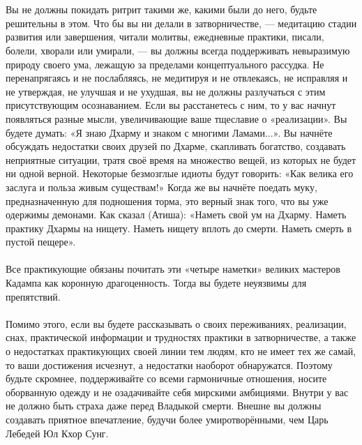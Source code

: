 \\ \\ Вы не должны покидать ритрит такими же, какими были до него, будьте решительны в этом. Что бы вы ни делали в затворничестве, — медитацию стадии развития или завершения, читали молитвы, ежедневные практики, писали, болели, хворали или умирали, — вы должны всегда поддерживать невыразимую природу своего ума, лежащую за пределами концептуального рассудка. Не перенапрягаясь и не послабляясь, не медитируя и не отвлекаясь, не исправляя и не утверждая, не улучшая и не ухудшая, вы не должны разлучаться с этим присутствующим осознаванием. Если вы расстанетесь с ним, то у вас начнут появляться разные мысли, увеличивающие ваше тщеславие о «реализации». Вы будете думать: «Я знаю Дхарму и знаком с многими Ламами...». Вы начнёте обсуждать недостатки своих друзей по Дхарме, скапливать богатство, создавать неприятные ситуации, тратя своё время на множество вещей, из которых не будет ни одной верной. Некоторые безмозглые идиоты будут говорить: «Как велика его заслуга и польза живым существам!» Когда же вы начнёте поедать муку, предназначенную для подношения торма, это верный знак того, что вы уже одержимы демонами. Как сказал (Атиша): «Наметь свой ум на Дхарму. Наметь практику Дхармы на нищету. Наметь нищету вплоть до смерти. Наметь смерть в пустой пещере».
\newpage
\\ \\ Все практикующие обязаны почитать эти «четыре наметки» великих мастеров Кадампа как коронную драгоценность. Тогда вы будете неуязвимы для препятствий.
\\ \\ Помимо этого, если вы будете рассказывать о своих переживаниях, реализации, снах, практической информации и трудностях практики в затворничестве, а также о недостатках практикующих своей линии тем людям, кто не имеет тех же самай, то ваши достижения исчезнут, а недостатки наоборот обнаружатся. Поэтому будьте скромнее, поддерживайте со всеми гармоничные отношения, носите оборванную одежду и не озадачивайте себя мирскими амбициями. Внутри у вас не должно быть страха даже перед Владыкой смерти. Внешне вы должны создавать приятное впечатление, будучи более умиротворёнными, чем Царь Лебедей Юл Кхор Сунг.
